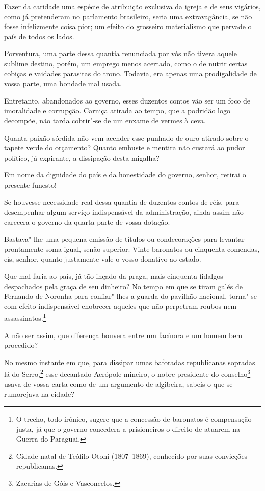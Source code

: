  Fazer da caridade uma espécie de atribuição exclusiva da igreja e de
seus vigários, como já pretenderam no parlamento brasileiro, seria uma
extravagância, se não fosse infelizmente coisa pior; um efeito do
grosseiro materialismo que pervade o país de todos os lados.

 Porventura, uma parte dessa quantia renunciada por vós não tivera
aquele sublime destino, porém, um emprego menos acertado, como o de
nutrir certas cobiças e vaidades parasitas do trono. Todavia, era
apenas uma prodigalidade de vossa parte, uma bondade mal usada. 

 Entretanto, abandonados ao governo, esses duzentos contos vão ser um
foco de imoralidade e corrupção. Carniça atirada ao tempo, que a
podridão logo decompõe, não tarda cobrir"-se de um enxame de vermes à ceva.  

 Quanta paixão sórdida não vem acender esse punhado de ouro atirado
sobre o tapete verde do orçamento? Quanto embuste e mentira não custará
ao pudor político, já expirante, a dissipação desta migalha?

 Em nome da dignidade do país e da honestidade do governo, senhor,
retirai o presente funesto!

 Se houvesse necessidade real dessa quantia de duzentos contos de réis,
para desempenhar algum serviço indispensável da administração, ainda
assim não carecera o governo da quarta parte de vossa dotação. 

 Bastava"-lhe uma pequena emissão de títulos ou condecorações para
levantar prontamente soma igual, senão superior. Vinte baronatos ou
cinquenta comendas, eis, senhor, quanto justamente vale o vosso
donativo ao estado. 

 Que mal faria ao país, já tão inçado da praga, mais cinquenta fidalgos
despachados pela graça de seu dinheiro? No tempo em que se tiram galés
de Fernando de Noronha para confiar"-lhes a guarda do pavilhão
nacional, torna"-se com efeito indispensável enobrecer aqueles que não
perpetram roubos nem assassinatos.\footnote{ O trecho, todo irônico, sugere 
que a concessão de baronatos é compensação justa, já que o governo concedera 
a prisioneiros o direito de atuarem na Guerra do Paraguai.}
 
A não ser assim, que diferença houvera entre um facínora e um homem bem procedido? 

 No mesmo instante em que, para dissipar umas baforadas republicanas
sopradas lá do Serro,\footnote{ Cidade natal de Teófilo Otoni (1807--1869), 
conhecido por suas convicções republicanas.}
 esse decantado Acrópole mineiro, o nobre presidente do
conselho\footnote{ Zacarias de Góis e Vasconcelos.}
 usava de vossa carta como de um argumento de algibeira, 
sabeis o que se rumorejava na cidade?

